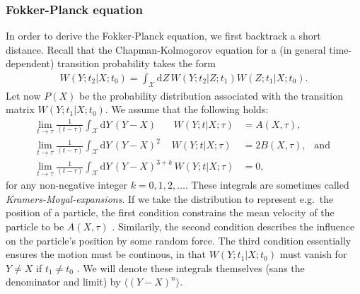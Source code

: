 \documentclass[../../master.tex]{subfiles}
\begin{document}
\subsubsection{Fokker-Planck equation}
In order to derive the Fokker-Planck equation, we first backtrack a short distance. Recall that the Chapman-Kolmogorov equation for a (in general time-dependent) transition probability takes the form 
\begin{align}
W(Y;t_2|X;t_0) = \int_\mathcal{X}\mathrm{d}Z\, W(Y;t_2|Z;t_1)W(Z;t_1|X;t_0). 
\end{align} 
Let now $P(X)$ be the probability distribution associated with the transition matrix $W(Y;t_1|X;t_0)$. We assume that the following holds:
\begin{align}
\lim_{t\rightarrow \tau}  \frac{1}{(t-\tau)} \int_\mathcal{X}\mathrm{d}Y\,(Y-X)\phantom{{}^{a+b}}\,W(Y;t|X;\tau)&=A(X,\tau), \\
%
\lim_{t\rightarrow \tau} \frac{1}{(t-\tau)} \int_\mathcal{X}\mathrm{d}Y\,(Y-X)^2\phantom{{}^{+k}}\,W(Y;t|X;\tau)&=2B(X,\tau), \ \ \text{ and }\\
%
\lim_{t\rightarrow \tau} \frac{1}{(t-\tau)} \int_\mathcal{X}\mathrm{d}Y\,(Y-X)^{3+k}\,W(Y;t|X;\tau)&=0,
\end{align}
for any non-negative integer $k=0,1,2,\dots$. These integrals are sometimes called \emph{Kramers-Moyal-expansions}. If we take the distribution to represent e.g.\ the position of a particle, the first condition constrains the mean velocity of the particle to be $A(X,\tau)$ \cite{gilks}. Similarily, the second condition describes the influence on the particle's position by some random force. The third condition essentially ensures the motion must be continous, in that $W(Y;t_1|X;t_0)$ must vanish for $Y\not=X$ if $t_1\not=t_0$ \cite{gardiner}. We will denote these integrals themselves (sans the denominator and limit) by $\langle (Y-X)^n\rangle$.
\end{document}
